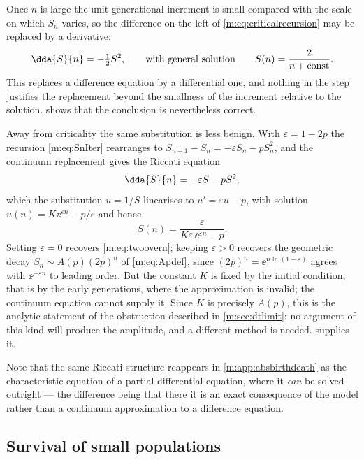 Once $n$ is large the unit generational increment is small compared with the scale
on which $S_n$ varies, so the difference on the left of
\cref{m:eq:criticalrecursion} may be replaced by a derivative:
\begin{equation*}
\dda{S}{n} = -\tfrac12S^2,
\qquad\text{with general solution}\qquad
S(n) = \frac{2}{n+\text{const}} .
\end{equation*}
This replaces a difference equation by a differential one, and nothing in the step
justifies the replacement beyond the smallness of the increment relative to the
solution.  shows that the conclusion is nevertheless
correct.

Away from criticality the same substitution is less benign. With
$\varepsilon = 1-2p$ the recursion \cref{m:eq:SnIter} rearranges to
$S_{n+1}-S_n = -\varepsilon S_n-pS_n^2$, and the continuum replacement gives the
Riccati equation
\begin{equation}
\label{m:eq:riccati}
\dda{S}{n} = -\varepsilon S - pS^2 ,
\end{equation}
which the substitution $u=1/S$ linearises to $u' = \varepsilon u+p$, with solution
$u(n) = K\ee^{\varepsilon n}-p/\varepsilon$ and hence
\begin{equation}
\label{m:eq:riccatisol}
S(n) = \frac{\varepsilon}{K\varepsilon\,\ee^{\varepsilon n}-p} .
\end{equation}
Setting $\varepsilon=0$ recovers \cref{m:eq:twoovern}; keeping $\varepsilon>0$
recovers the geometric decay $S_n\sim A(p)(2p)^n$ of \cref{m:eq:Apdef}, since
$(2p)^n = \ee^{n\ln(1-\varepsilon)}$ agrees with $\ee^{-\varepsilon n}$ to leading
order. But the constant $K$ is fixed by the initial condition, that is by the early
generations, where the approximation is invalid; the continuum equation cannot
supply it. Since $K$ is precisely $A(p)$, this is the analytic statement of the
obstruction described in \cref{m:sec:dtlimit}: no argument of this kind will produce
the amplitude, and a different method is needed. \ChAcap{} supplies it.

Note that the same Riccati structure reappears in \cref{m:app:absbirthdeath} as the
characteristic equation of a partial differential equation, where it \emph{can} be
solved outright --- the difference being that there it is an exact consequence of
the model rather than a continuum approximation to a difference equation.

\subsection{Survival of small populations}
\label{m:app:smallpops}

